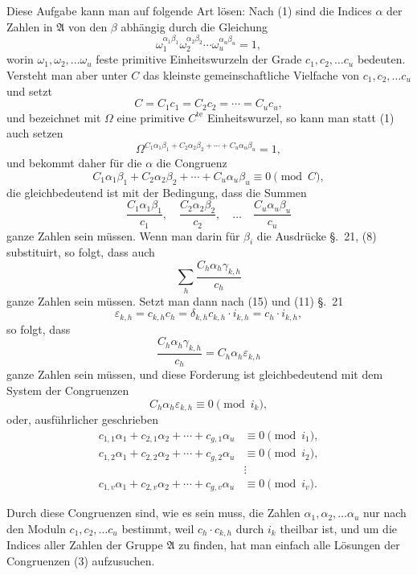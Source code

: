 \documentclass[12pt,a4paper]{article}
\theoremstyle{plain}
\theoremstyle{definition}
\theoremstyle{remark}
\begin{document}
Diese Aufgabe kann man auf folgende Art lösen: Nach (1) sind die Indices $\alpha$ der Zahlen in $\mathfrak{A}$ von den $\beta$ abhängig durch die Gleichung
\begin{equation}\tag{1}
\omega_1^{\alpha_1\beta_1} \omega_2^{\alpha_2\beta_2} \cdots \omega_u^{\alpha_u\beta_u} = 1,
\end{equation}
worin $\omega_1, \omega_2, \ldots \omega_u$ feste primitive Einheitswurzeln der Grade $c_1, c_2, \ldots c_u$ bedeuten. Versteht man aber unter $C$ das kleinste gemeinschaftliche Vielfache von $c_1, c_2, \ldots c_u$ und setzt
\begin{equation}\tag{2}
C = C_1 c_1 = C_2 c_2 = \cdots = C_u c_u,
\end{equation}
und bezeichnet mit $\Omega$ eine primitive $C^{\text{te}}$ Einheitswurzel, so kann man statt (1) auch setzen
\[
\Omega^{C_1 \alpha_1 \beta_1 + C_2 \alpha_2 \beta_2 + \cdots + C_u \alpha_u \beta_u} = 1,
\]
und bekommt daher für die $\alpha$ die Congruenz
\[
C_1 \alpha_1 \beta_1 + C_2 \alpha_2 \beta_2 + \cdots + C_u \alpha_u \beta_u \equiv 0 \pmod{C},
\]
die gleichbedeutend ist mit der Bedingung, dass die Summen
\[
\frac{C_1 \alpha_1 \beta_1}{c_1}, \quad \frac{C_2 \alpha_2 \beta_2}{c_2}, \quad \ldots \quad \frac{C_u \alpha_u \beta_u}{c_u}
\]
ganze Zahlen sein müssen. Wenn man darin für $\beta_i$ die Ausdrücke \S.~21, (8) substituirt, so folgt, dass auch
\[
\sum_h \frac{C_h \alpha_h \gamma_{k,h}}{c_h}
\]
ganze Zahlen sein müssen. Setzt man dann nach (15) und (11) \S.~21
\[
\varepsilon_{k,h} = c_{k,h} c_h = \delta_{k,h} c_{k,h} \cdot i_{k,h} = c_h \cdot i_{k,h},
\]
so folgt, dass
\[
\frac{C_h \alpha_h \gamma_{k,h}}{c_h} = C_h \alpha_h \varepsilon_{k,h}
\]
ganze Zahlen sein müssen, und diese Forderung ist gleichbedeutend mit dem System der Congruenzen
\[
C_h \alpha_h \varepsilon_{k,h} \equiv 0 \pmod{i_k},
\]
oder, ausführlicher geschrieben
\begin{equation}\tag{3}
\begin{aligned}
c_{1,1} \alpha_1 + c_{2,1} \alpha_2 + \cdots + c_{g,1} \alpha_u &\equiv 0 \pmod{i_1}, \\
c_{1,2} \alpha_1 + c_{2,2} \alpha_2 + \cdots + c_{g,2} \alpha_u &\equiv 0 \pmod{i_2}, \\
&\vdots \\
c_{1,v} \alpha_1 + c_{2,v} \alpha_2 + \cdots + c_{g,v} \alpha_u &\equiv 0 \pmod{i_v}.
\end{aligned}
\end{equation}

Durch diese Congruenzen sind, wie es sein muss, die Zahlen $\alpha_1, \alpha_2, \ldots \alpha_u$ nur nach den Moduln $c_1, c_2, \ldots c_u$ bestimmt, weil $c_h \cdot c_{k,h}$ durch $i_k$ theilbar ist, und um die Indices aller Zahlen der Gruppe $\mathfrak{A}$ zu finden, hat man einfach alle Lösungen der Congruenzen (3) aufzusuchen.
\end{document}
